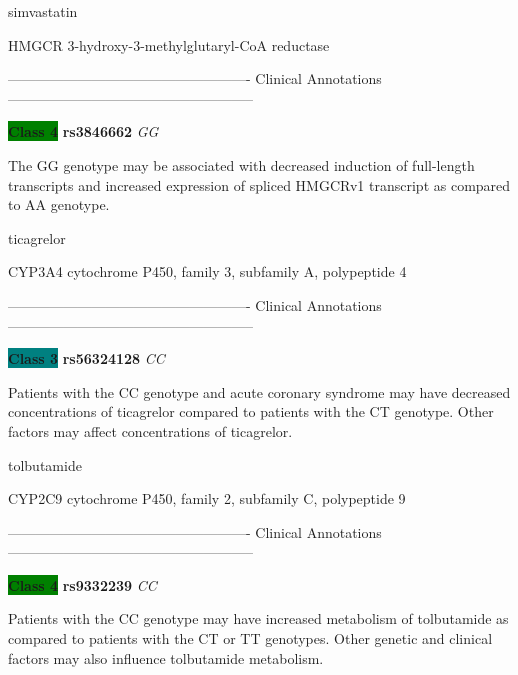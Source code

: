 \documentclass{resume} %
\begin{document}
\begin{rSection}{ simvastatin }
\begin{rSubsection}{ HMGCR }{ 3-hydroxy-3-methylglutaryl-CoA reductase }{}{}
\item[] ---------------------------------------------------- Clinical Annotations -----------------------------------------------------\newline
\item \textbf{\colorbox{green} {Class 4}} \textbf{ rs3846662 } \textit{ GG }
\item[] The GG genotype may be associated with decreased induction of full-length transcripts and increased expression of spliced HMGCRv1 transcript  as compared to AA genotype.
\end{rSubsection}

\end{rSection}\begin{rSection}{ ticagrelor }
\item[]

\begin{rSubsection}{ CYP3A4 }{ cytochrome P450, family 3, subfamily A, polypeptide 4 }{}{}
\item[]

\item[] ---------------------------------------------------- Clinical Annotations -----------------------------------------------------\newline
\item \textbf{\colorbox{teal} {Class 3}} \textbf{ rs56324128 } \textit{ CC }
\item[] Patients with the CC genotype and acute coronary syndrome may have decreased concentrations of ticagrelor compared to patients with the CT genotype. Other factors may affect concentrations of ticagrelor.
\end{rSubsection}

\end{rSection}\begin{rSection}{ tolbutamide }
\item[]

\begin{rSubsection}{ CYP2C9 }{ cytochrome P450, family 2, subfamily C, polypeptide 9 }{}{}
\item[]

\item[] ---------------------------------------------------- Clinical Annotations -----------------------------------------------------\newline
\item \textbf{\colorbox{green} {Class 4}} \textbf{ rs9332239 } \textit{ CC }
\item[] Patients with the CC genotype may have increased metabolism of tolbutamide as compared to patients with the CT or TT genotypes. Other genetic and clinical factors may also influence tolbutamide metabolism.
\end{rSubsection}


\end{rSection}
\end{document}
